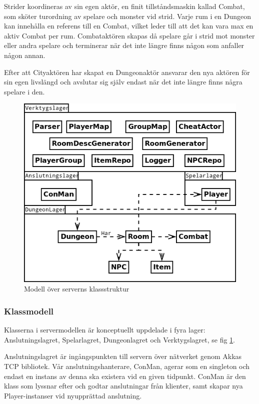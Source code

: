 \documentclass[a4paper]{article}
\begin{document}
Strider koordineras av sin egen aktör, en finit tillståndsmaskin kallad Combat, som sköter turordning av spelare och monster vid strid. Varje rum i en Dungeon kan innehålla en referens till en Combat, vilket leder till att det kan vara max en aktiv Combat per rum. Combataktören skapas då spelare går i strid mot monster eller andra spelare och terminerar när det inte längre finns någon som anfaller någon annan. 

Efter att Cityaktören har skapat en Dungeonaktör ansvarar den nya aktören för sin egen livslängd och avslutar sig själv endast när det inte längre finns några spelare i den.

\begin{figure}[hbt]
\centering
\includegraphics[width=1.0\textwidth]{serverUml2}
\caption{\label{fig:ServerKlassModell}Modell över serverns klassstruktur}
\end{figure}

\subsubsection{Klassmodell}
Klasserna i servermodellen är konceptuellt uppdelade i fyra lager: Anslutningslagret, Spelarlagret, Dungeonlagret och Verktygslagret, se fig \ref{fig:ServerKlassModell}. 

Anslutningslagret är ingångspunkten till servern över nätverket genom Akkas TCP bibliotek. Vår anslutningshanterare, ConMan, agerar som en singleton och endast en instans av denna ska existera vid en given tidpunkt. ConMan är den klass som lyssnar efter och godtar anslutningar från klienter, samt skapar nya Player-instanser vid nyupprättad anslutning. 
\end{document}
